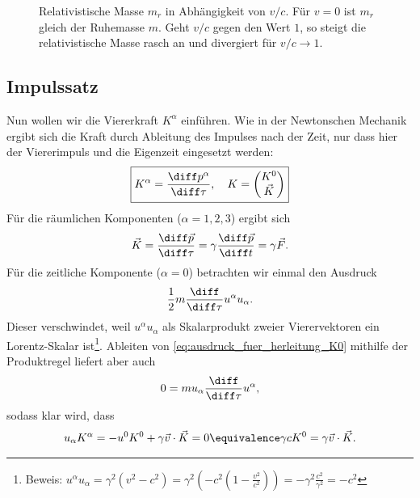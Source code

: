 \begin{figure}[htb]
    \centering
    \tfigIncreaseOfRelativisticMass
    \caption{Relativistische Masse $m_r$ in Abhängigkeit von $v/c$. Für $v=0$ ist $m_r$ gleich der Ruhemasse $m$. Geht $v/c$ gegen den Wert $1$, so steigt die relativistische Masse rasch an und divergiert für $v/c\rightarrow 1$.}
    \label{fig:zunahme_impulsmasse}
\end{figure}



\subsection{Impulssatz}

Nun wollen wir die Viererkraft $K^\alpha$ einführen. Wie in der Newtonschen Mechanik ergibt sich die Kraft durch Ableitung des Impulses nach der Zeit, nur dass hier der Viererimpuls und die Eigenzeit eingesetzt werden:
\begin{align}
    \label{eq:impulssatz}
    \boxed{K^\alpha = \frac{\diff p^\alpha}{\diff\tau},  \quad K=\begin{pmatrix} K^0\\ \vec K \end{pmatrix}}
\end{align}
Für die räumlichen Komponenten ($\alpha=1,2,3$) ergibt sich
\begin{align*}
    \vec K = \frac{\diff\vec p}{\diff\tau} = \gamma \frac{\diff\vec p}{\diff t} = \gamma\vec F.
\end{align*}
Für die zeitliche Komponente ($\alpha=0$) betrachten wir einmal den Ausdruck
\begin{align}
    \label{eq:ausdruck_fuer_herleitung_K0}
    \frac{1}{2}m\frac{\diff}{\diff\tau}u^\alpha u_\alpha.
\end{align}
Dieser verschwindet, weil $u^\alpha u_\alpha$ als Skalarprodukt zweier Vierervektoren ein Lorentz-Skalar ist\footnote{Beweis: $u^\alpha u_\alpha=\gamma^2(v^2-c^2)=\gamma^2\left(-c^2\left(1-\frac{v^2}{c^2}\right)\right)=-\gamma^2 \frac{c^2}{\gamma^2}=-c^2$}.
Ableiten von \eqref{eq:ausdruck_fuer_herleitung_K0} mithilfe der Produktregel liefert aber auch
\begin{align*}
    0 = m u_\alpha\frac{\diff}{\diff\tau}u^\alpha,
\end{align*}
sodass klar wird, dass
\begin{align*}
    u_\alpha K^\alpha = -u^0 K^0 + \gamma\vec v\cdot \vec K = 0 \equivalence \gamma c K^0=\gamma\vec v\cdot \vec K.
\end{align*}
